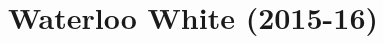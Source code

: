 \documentclass[10pt]{article}
\title{\vspace{-7ex}\Large{Waterloo White (2015-16)}}
\author{}
\date{}
\begin{document}
    
\begin{landscape}
\begin{multicols}{2}

\pagestyle{fancy}
\maketitle
\vspace{-16ex}
\tableofcontents

\end{multicols}
\end{landscape}
\end{document}
